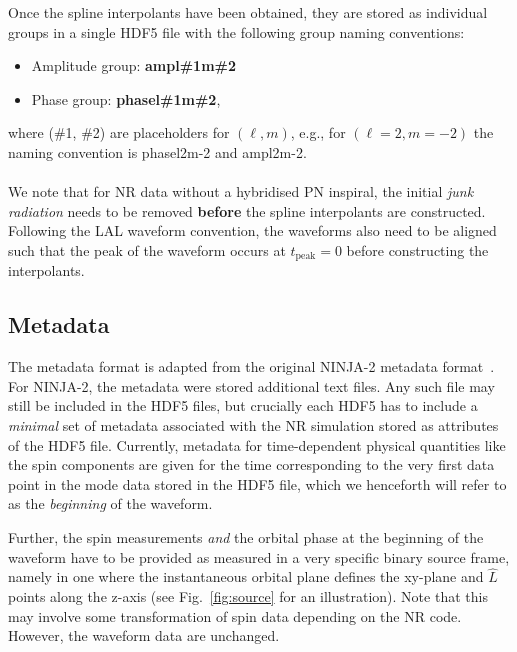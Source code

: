 \documentclass[aps,prd,amssymb,amsmath,amsfonts,superscriptaddress,
floatfix ,preprintnumbers,altaffilletter]{revtex4}
\begin{document}
Once the spline interpolants have been obtained, they are stored as individual groups in a single HDF5 file with the following group naming
conventions: 
\begin{itemize}
  \item Amplitude group: \textbf{amp\textunderscore l\#1\textunderscore m\#2}
  \item Phase group: \textbf{phase\textunderscore  l\#1\textunderscore m\#2},
\end{itemize}
where (\#1, \#2) are placeholders for $(\ell, m)$, e.g., for $(\ell=2, m=-2)$ the naming convention is phase\textunderscore l2\textunderscore m-2 and 
amp\textunderscore l2\textunderscore m-2. \\
\\We note that for NR data without a hybridised PN inspiral, the initial \emph{junk radiation} needs to be removed \textbf{before} the spline interpolants are constructed. 
Following the LAL waveform convention, the waveforms also need to be aligned such that the peak of the waveform occurs at $t_\mathrm{peak}=0$ 
before constructing the interpolants.


\subsection{Metadata}
\label{sec:meta}
The metadata format is adapted from the original NINJA-2 metadata format~\cite{Brown:2007jx}. For NINJA-2, the metadata were stored
additional text files. Any such file may still be included in the HDF5 files, but crucially 
each HDF5 has to include a \emph{minimal} set of metadata associated with the NR simulation stored as attributes of the HDF5 file. Currently, metadata for time-dependent physical quantities like the spin components are given for the time corresponding to the very first data point in the mode data stored in the HDF5 file, which we henceforth will refer to as the \emph{beginning} of the waveform. 

Further, the spin measurements \emph{and} the orbital phase at the beginning of the waveform have to be provided as measured in a very specific binary source frame, namely in one where the instantaneous orbital plane
defines the xy-plane and $\hat{L}$ points along the z-axis (see Fig.~\ref{fig:source} for an illustration). Note that this may involve some transformation of spin data depending on the NR code. However, the waveform data are unchanged.
\end{document}
